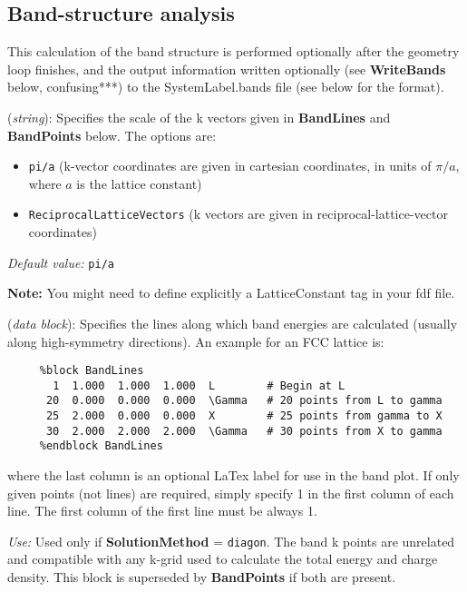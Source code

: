 \documentclass[11pt]{article}
\begin{document}
\subsection{Band-structure analysis}

This calculation of the band structure is performed optionally after
the geometry loop finishes, and the output information written
optionally (see {\bf WriteBands} below, confusing***) to the
SystemLabel.bands file (see below for the format).

\begin{description}
\itemsep 10pt
\parsep 0pt

\item[{\bf BandLinesScale}] ({\it string}): 
Specifies the scale of the k vectors given in {\bf BandLines} 
and {\bf BandPoints} below.
The options are:
\begin{itemize}
\item {\tt pi/a} (k-vector coordinates are given in cartesian 
coordinates, in units of $\pi/a$, where $a$ is the lattice constant)
\item {\tt ReciprocalLatticeVectors} (k vectors are given in
reciprocal-lattice-vector coordinates)
\end{itemize}

{\it Default value:} {\tt pi/a}

{\bf Note:} You might need to define explicitly a LatticeConstant tag
in your fdf file.

\item[{\bf BandLines}] ({\it data block}): 
Specifies the lines along which band energies are calculated
(usually along high-symmetry directions).
An example for an FCC lattice is:

\begin{verbatim}
     %block BandLines
       1  1.000  1.000  1.000  L        # Begin at L
      20  0.000  0.000  0.000  \Gamma   # 20 points from L to gamma
      25  2.000  0.000  0.000  X        # 25 points from gamma to X
      30  2.000  2.000  2.000  \Gamma   # 30 points from X to gamma
     %endblock BandLines
\end{verbatim}

where the last column is an optional LaTex label for use in the band plot.
If only given points (not lines) are required, simply specify 1 in the
first column of each line. The first column of the first line must be 
always 1.

{\it Use:} Used only if {\bf SolutionMethod} = {\tt diagon}.
The band k points are unrelated and compatible with any k-grid used
to calculate the total energy and charge density.
This block is superseded by {\bf BandPoints} if both are present.


\end{description}
\end{document}
